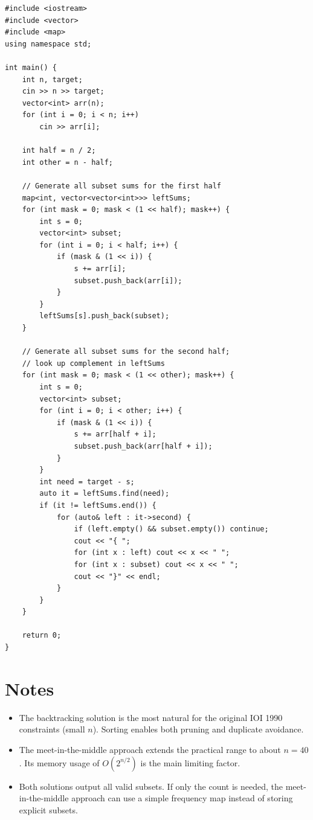 \documentclass[11pt,a4paper]{article}
\begin{document}
\begin{lstlisting}
#include <iostream>
#include <vector>
#include <map>
using namespace std;

int main() {
    int n, target;
    cin >> n >> target;
    vector<int> arr(n);
    for (int i = 0; i < n; i++)
        cin >> arr[i];

    int half = n / 2;
    int other = n - half;

    // Generate all subset sums for the first half
    map<int, vector<vector<int>>> leftSums;
    for (int mask = 0; mask < (1 << half); mask++) {
        int s = 0;
        vector<int> subset;
        for (int i = 0; i < half; i++) {
            if (mask & (1 << i)) {
                s += arr[i];
                subset.push_back(arr[i]);
            }
        }
        leftSums[s].push_back(subset);
    }

    // Generate all subset sums for the second half;
    // look up complement in leftSums
    for (int mask = 0; mask < (1 << other); mask++) {
        int s = 0;
        vector<int> subset;
        for (int i = 0; i < other; i++) {
            if (mask & (1 << i)) {
                s += arr[half + i];
                subset.push_back(arr[half + i]);
            }
        }
        int need = target - s;
        auto it = leftSums.find(need);
        if (it != leftSums.end()) {
            for (auto& left : it->second) {
                if (left.empty() && subset.empty()) continue;
                cout << "{ ";
                for (int x : left) cout << x << " ";
                for (int x : subset) cout << x << " ";
                cout << "}" << endl;
            }
        }
    }

    return 0;
}
\end{lstlisting}

\section{Notes}

\begin{itemize}
  \item The backtracking solution is the most natural for the original IOI
    1990 constraints (small $n$). Sorting enables both pruning and duplicate
    avoidance.
  \item The meet-in-the-middle approach extends the practical range to about
    $n = 40$. Its memory usage of $O(2^{n/2})$ is the main limiting factor.
  \item Both solutions output all valid subsets. If only the count is needed,
    the meet-in-the-middle approach can use a simple frequency map instead of
    storing explicit subsets.
\end{itemize}
\end{document}

